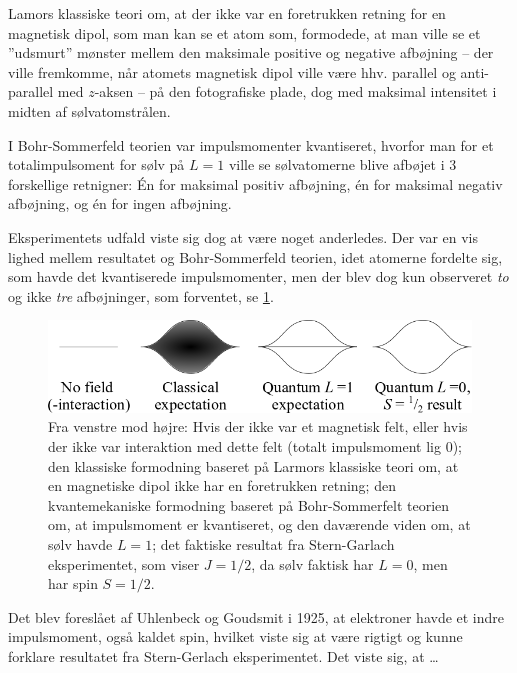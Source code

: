 Lamors klassiske teori om, at der ikke var en foretrukken retning for en magnetisk dipol, som man kan se et atom som, formodede, at man ville se et ''udsmurt'' mønster mellem den maksimale positive og negative afbøjning -- der ville fremkomme, når atomets magnetisk dipol ville være hhv. parallel og anti-parallel med $z$-aksen -- på den fotografiske plade, dog med maksimal intensitet i midten af sølvatomstrålen.

I Bohr-Sommerfeld teorien var impulsmomenter kvantiseret, hvorfor man for et totalimpulsoment for sølv på $L = 1$ ville se sølvatomerne blive afbøjet i 3 forskellige retnigner: Én for maksimal positiv afbøjning, én for maksimal negativ afbøjning, og én for ingen afbøjning.

Eksperimentets udfald viste sig dog at være noget anderledes. Der var en vis lighed mellem resultatet og Bohr-Sommerfeld teorien, idet atomerne fordelte sig, som havde det kvantiserede impulsmomenter, men der blev dog kun observeret \emph{to} og ikke \emph{tre} afbøjninger, som forventet, se \cref{fig:Q08_SternGarlachExperimentResult}.

\begin{figure}[!h]
    \centering
    \includegraphics[width=\textwidth]{Q08/images/SternGerlachExperimentResult.png}
    \caption{Fra venstre mod højre: Hvis der ikke var et magnetisk felt, eller hvis der ikke var interaktion med dette felt (totalt impulsmoment lig $0$); den klassiske formodning baseret på Larmors klassiske teori om, at en magnetiske dipol ikke har en foretrukken retning; den kvantemekaniske formodning baseret på Bohr-Sommerfelt teorien om, at impulsmoment er kvantiseret, og den daværende viden om, at sølv havde $L = 1$; det faktiske resultat fra Stern-Garlach eksperimentet, som viser $J = 1/2$, da sølv faktisk har $L = 0$, men har spin $S = 1/2$.}
    \label{fig:Q08_SternGarlachExperimentResult}
\end{figure}

Det blev foreslået af Uhlenbeck og Goudsmit i 1925, at elektroner havde et indre impulsmoment, også kaldet spin, hvilket viste sig at være rigtigt og kunne forklare resultatet fra Stern-Gerlach eksperimentet.
\noindent
Det viste sig, at \ldots


